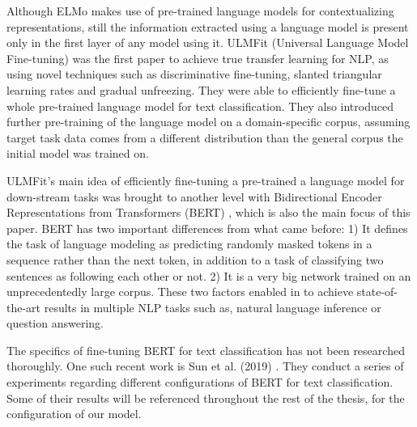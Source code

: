 \documentclass[../main.tex]{subfiles}
\begin{document}
Although ELMo makes use of pre-trained language models for contextualizing representations, still the information extracted using a language model is present only in the first layer of any model using it. ULMFit (Universal Language Model Fine-tuning) \cite{Howard2018} was the first paper to achieve true transfer learning for NLP, as using novel techniques such as discriminative fine-tuning, slanted triangular learning rates and gradual unfreezing. They were able to efficiently fine-tune a whole pre-trained language model for text classification. They also introduced further pre-training of the language model on a domain-specific corpus, assuming target task data comes from a different distribution than the general corpus the initial model was trained on. 

ULMFit's main idea of efficiently fine-tuning a pre-trained a language model for down-stream tasks was brought to another level with Bidirectional Encoder Representations from Transformers (BERT) \cite{Devlin2018}, which is also the main focus of this paper. BERT has two important differences from what came before: 1) It defines the task of language modeling as predicting randomly masked tokens in a sequence rather than the next token, in addition to a task of classifying two sentences as following each other or not. 2) It is a very big network trained on an unprecedentedly large corpus. These two factors enabled in to achieve state-of-the-art results in multiple NLP tasks such as, natural language inference or question answering.

The specifics of fine-tuning BERT for text classification has not been researched thoroughly. One such recent work is Sun et al. (2019) \cite{Sun2019}. They conduct a series of experiments regarding different configurations of BERT for text classification. Some of their results will be referenced throughout the rest of the thesis, for the configuration of our model.
\end{document}
